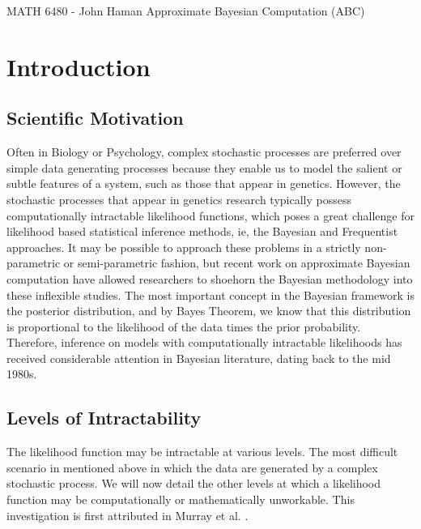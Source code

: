 \documentclass[12pt]{article}
\newcommand{\CourseName}{\textsf{MATH 6480 - John Haman }}
\begin{document}
\medskip

  \CourseName \hfill \textsf{Approximate Bayesian Computation (ABC)}\\
\medskip


\section{Introduction}

\subsection{Scientific Motivation}


Often in Biology or Psychology, complex stochastic processes are preferred over simple data generating processes because they enable us to model the salient or subtle features of a system, such as those that appear in genetics. However, the stochastic processes that appear in genetics research typically possess computationally intractable likelihood functions, which poses a great challenge for likelihood based statistical inference methods, ie, the Bayesian and Frequentist approaches. It may be possible to approach these problems in a strictly non-parametric or semi-parametric fashion, but recent work on approximate Bayesian computation have allowed researchers to shoehorn the Bayesian methodology into these inflexible studies. The most important concept in the Bayesian framework is the posterior distribution, and by Bayes Theorem, we know that this distribution is proportional to the likelihood of the data times the prior probability. Therefore, inference on models with computationally intractable likelihoods has received considerable attention in Bayesian literature, dating back to the mid 1980s. 

\subsection{Levels of Intractability}

The likelihood function may be intractable at various levels. The most difficult scenario in mentioned above in which the data are generated by a complex stochastic process. We will now detail the other levels at which a likelihood function may be computationally or mathematically unworkable. This investigation is first attributed in Murray et al. \cite{murray}.
\end{document}
